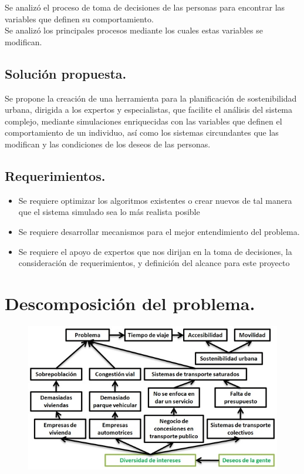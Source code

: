 \documentclass[10pt]{article}
\begin{document}
Se analizó el proceso de toma de decisiones de las personas para encontrar las variables que definen su comportamiento.\\

Se analizó los principales procesos mediante los cuales estas variables se modifican. 

\subsection{Solución propuesta.}
 
Se propone la creación de una herramienta para la planificación de sostenibilidad urbana, dirigida a los expertos y especialistas, que facilite el análisis del sistema complejo, mediante simulaciones enriquecidas con las variables que definen el comportamiento de un individuo, así como los sistemas circundantes que las modifican y las condiciones de los deseos de las personas.  

\subsection{Requerimientos.}
\begin{itemize}
\item  Se requiere optimizar los algoritmos existentes o crear nuevos de tal manera que el sistema simulado sea lo más realista posible

\item Se requiere desarrollar mecanismos para el mejor entendimiento del problema. 

\item Se requiere el apoyo de expertos que nos dirijan en la toma de decisiones, la consideración de requerimientos, y definición del alcance para este proyecto

\end{itemize}
\newpage
\section{Descomposición del problema.}
\begin{figure}[htbp!]
	\begin{center}
		\includegraphics[scale = 1.0]{Imagen/Problema.jpg}
	\end{center}
\end{figure}
\end{document}
